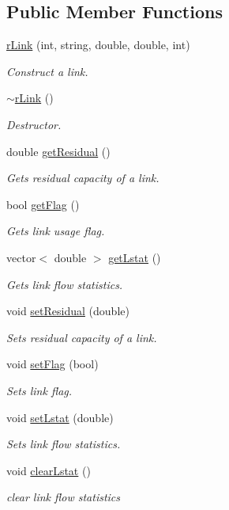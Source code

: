 \subsection*{\-Public \-Member \-Functions}
\begin{DoxyCompactItemize}
\item 
\hyperlink{classrLink_acd7f5f66409693e86cd33e4a6e6964b8}{r\-Link} (int, string, double, double, int)
\begin{DoxyCompactList}\small\item\em \-Construct a link. \end{DoxyCompactList}\item 
\hyperlink{classrLink_ac2f6e30278ba2967b96086435711f672}{$\sim$r\-Link} ()
\begin{DoxyCompactList}\small\item\em \-Destructor. \end{DoxyCompactList}\item 
double \hyperlink{classrLink_aa840b5668425c224a451ec1663754a82}{get\-Residual} ()
\begin{DoxyCompactList}\small\item\em \-Gets residual capacity of a link. \end{DoxyCompactList}\item 
bool \hyperlink{classrLink_a4639d6b69acbb669d0cbb7af5cbf152b}{get\-Flag} ()
\begin{DoxyCompactList}\small\item\em \-Gets link usage flag. \end{DoxyCompactList}\item 
vector$<$ double $>$ \hyperlink{classrLink_a86c80f0a22f7703601d8a242c2fb471f}{get\-Lstat} ()
\begin{DoxyCompactList}\small\item\em \-Gets link flow statistics. \end{DoxyCompactList}\item 
void \hyperlink{classrLink_a7ac5fdbd1b4fc92cbfd5d8e421477148}{set\-Residual} (double)
\begin{DoxyCompactList}\small\item\em \-Sets residual capacity of a link. \end{DoxyCompactList}\item 
void \hyperlink{classrLink_a15022659ea92d086138f817203ede689}{set\-Flag} (bool)
\begin{DoxyCompactList}\small\item\em \-Sets link flag. \end{DoxyCompactList}\item 
void \hyperlink{classrLink_a719c8cee2887f566dd4e0ca6df81f0de}{set\-Lstat} (double)
\begin{DoxyCompactList}\small\item\em \-Sets link flow statistics. \end{DoxyCompactList}\item 
void \hyperlink{classrLink_a60204cffa46245fb1e2c7d7a7872dbcb}{clear\-Lstat} ()
\begin{DoxyCompactList}\small\item\em clear link flow statistics \end{DoxyCompactList}\end{DoxyCompactItemize}



